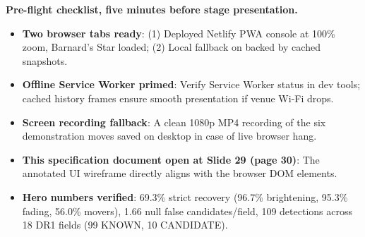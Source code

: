 \documentclass[11pt,a4paper]{article}
\newcommand{\code}[1]{\texttt{\small\detokenize{#1}}}
\begin{document}
\vspace{4pt}
\textbf{Pre-flight checklist, five minutes before stage presentation.}
\begin{itemize}[leftmargin=1.5em,itemsep=2pt,topsep=2pt]
\item \textbf{Two browser tabs ready}: (1) Deployed Netlify PWA console at 100\% zoom, Barnard's Star loaded; (2) Local fallback on \code{localhost:8000} backed by cached snapshots.
\item \textbf{Offline Service Worker primed}: Verify Service Worker status in dev tools; cached history frames ensure smooth presentation if venue Wi-Fi drops.
\item \textbf{Screen recording fallback}: A clean 1080p MP4 recording of the six demonstration moves saved on desktop in case of live browser hang.
\item \textbf{This specification document open at Slide 29 (page 30)}: The annotated UI wireframe directly aligns with the browser DOM elements.
\item \textbf{Hero numbers verified}: 69.3\% strict recovery (96.7\% brightening, 95.3\% fading, 56.0\% movers), 1.66 null false candidates/field, 109 detections across 18 DR1 fields (99 KNOWN, 10 CANDIDATE).
\end{itemize}
\end{document}
